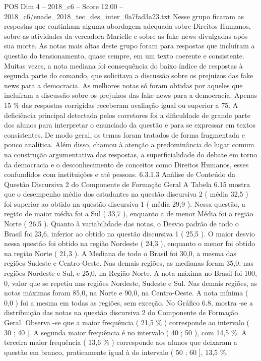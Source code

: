 \begin{textsample}{POS Dim 4 – 2018\_c6 – Score 12.00 – 2018\_c6/enade\_2018\_tec\_des\_inter\_0a7fad3a23.txt}
Nesse grupo ficaram as respostas que continham alguma abordagem adequada sobre Direitos Humanos, sobre as atividades da vereadora Marielle e sobre as fake news divulgadas após sua morte.
As notas mais altas deste grupo foram para respostas que incluíram a questão do tensionamento, quase sempre, em um texto coerente e consistente.
Muitas vezes, a nota mediana foi consequência do baixo índice de respostas à segunda parte do comando, que solicitava a discussão sobre os prejuízos das fake news para a democracia.
As melhores notas só foram obtidas por aqueles que incluíram a discussão sobre os prejuízos das fake news para a democracia.
Apenas 15 \% das respostas corrigidas receberam avaliação igual ou superior a 75.
A deficiência principal detectada pelos corretores foi a dificuldade de grande parte dos alunos para interpretar o enunciado da questão e para se expressar em textos consistentes.
De modo geral, os temas foram tratados de forma fragmentada e pouco analítica.
Além disso, chamou à atenção a predominância do lugar comum na construção argumentativa das respostas, a superficialidade do debate em torno da democracia e o desconhecimento de conceitos como Direitos Humanos, esses confundidos com instituições e até pessoas. 6.3.1.3 Análise de Conteúdo da Questão Discursiva 2 do Componente de Formação Geral A Tabela 6.15 mostra que o desempenho médio dos estudantes na questão discursiva 2 ( média 32,5 ) foi superior ao obtido na questão discursiva 1 ( média 29,9 ).
Nessa questão, a região de maior média foi a Sul ( 33,7 ), enquanto a de menor Média foi a região Norte ( 26,5 ).
Quanto à variabilidade das notas, o Desvio padrão de todo o Brasil foi 23,6, inferior ao obtido na questão discursiva 1 ( 25,5 ).
O maior desvio nessa questão foi obtido na região Nordeste ( 24,3 ), enquanto o menor foi obtido na região Norte ( 21,3 ).
A Mediana de todo o Brasil foi 30,0, a mesma das regiões Sudeste e Centro-Oeste.
Nas demais regiões, as medianas foram 35,0, nas regiões Nordeste e Sul, e 25,0, na Região Norte.
A nota máxima no Brasil foi 100, 0, valor que se repetiu nas regiões Nordeste, Sudeste e Sul.
Nas demais regiões, as notas máximas foram 85,0, na Norte e 90,0, na Centro-Oeste.
A nota mínima ( 0,0 ) foi a mesma em todas as regiões, sem exceção.
No Gráfico 6.8, mostra -se a distribuição das notas na questão discursiva 2 do Componente de Formação Geral.
Observa -se que a maior frequência ( 21,5 \% ) corresponde ao intervalo ( 30 ; 40 ].
A segunda maior frequência é no intervalo ( 40 ; 50 ), com 14,5 \%.
A terceira maior frequência ( 13,6 \% ) corresponde aos alunos que deixaram a questão em branco, praticamente igual à do intervalo ( 50 ; 60 ], 13,5 \%.

\end{textsample}
